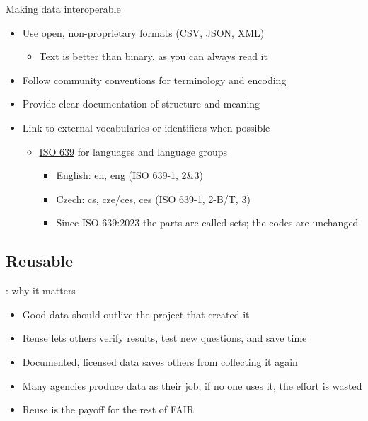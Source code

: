 \documentclass[aspectratio=169]{beamer}
\begin{document}
\begin{frame}{Making data interoperable}
\begin{itemize}
\item Use open, non-proprietary formats (CSV, JSON, XML)
  \begin{itemize}
  \item Text is better than binary, as you can always read it
  \end{itemize}
\item Follow community conventions for terminology and encoding
\item Provide clear documentation of structure and meaning
\item Link to external vocabularies or identifiers when possible
  \begin{itemize}
  \item \href{https://en.wikipedia.org/wiki/ISO_639}{ISO 639} for languages and language groups
    \begin{itemize}
    \item English: en, eng (ISO 639-1, 2\&3)
    \item Czech: cs, cze/ces, ces (ISO 639-1, 2-B/T, 3)
    \item Since ISO 639:2023 the parts are called sets; the codes are unchanged
    \end{itemize}
  \end{itemize}
\end{itemize}
\end{frame}

\subsection{Reusable}
\begin{frame}{: why it matters}
\begin{itemize}
  \item Good data should outlive the project that created it
  \item Reuse lets others verify results, test new questions, and save time
  \item Documented, licensed data saves others from collecting it again
  \item Many agencies produce data as their job; if no one uses it, the effort is wasted
  \item Reuse is the payoff for the rest of FAIR
\end{itemize}
\end{frame}
\end{document}
